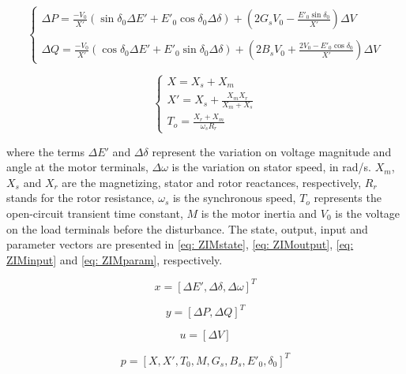 \begin{apendicesenv}
\begin{equation}
    \begin{cases}
        \Delta P = \frac{-V_{0}}{X'}(\sin{\delta_{0}}\Delta E' + E'_{0}\cos{\delta_{0}}\Delta \delta) + \left(2G_{s} V_{0} - \frac{E'_{0} \sin{\delta_{0}}}{X'}\right)\Delta V \\
        \\
        \Delta Q = \frac{-V_{0}}{X'}(\cos{\delta_{0}}\Delta E' + E'_{0}\sin{\delta_{0}}\Delta\delta) + \left(2B_{s} V_{0} + \frac{2V_{0} - E'_{0} \cos{\delta_{0}}}{X'}\right)\Delta V
    \end{cases}
    \label{eq: yZIM}
\end{equation}

\begin{equation}
    \begin{cases}
    X = X_{s} + X_{m} \\
    X' = X_{s} + \frac{X_{m} X_{r}}{X_{m} + X_{s}} \\
    T_{o} = \frac{X_{r} + X_{m}}{\omega_{s} R_{r}}
    \end{cases}
    \label{eq: terms}
\end{equation}

\noindent where the terms $\Delta E'$ and $\Delta \delta$ represent the variation on voltage magnitude and angle at the motor terminals, $\Delta \omega$ is the variation on stator speed, in rad/s. $X_m$, $X_s$ and $X_r$ are the magnetizing, stator and rotor reactances, respectively, $R_r$ stands for the rotor resistance, $\omega_{s}$ is the synchronous speed, $T_o$ represents the open-circuit transient time constant, $M$ is the motor inertia and $V_{0}$ is the voltage on the load terminals before the disturbance. The state, output, input and parameter vectors are presented in \eqref{eq: ZIMstate}, \eqref{eq: ZIMoutput}, \eqref{eq: ZIMinput} and \eqref{eq: ZIMparam}, respectively.

\begin{equation}
	x = [\Delta E', \Delta \delta, \Delta \omega]^{T}
	\label{eq: ZIMstate}
\end{equation}

\begin{equation}
	y = [\Delta P, \Delta Q]^{T}
	\label{eq: ZIMoutput}
\end{equation}

\begin{equation}
	u = [\Delta V]
	\label{eq: ZIMinput}
\end{equation}

\begin{equation}
	p = [X, X', T_{0}, M, G_{s}, B_{s}, E'_{0}, \delta_{0}]^{T}
	\label{eq: ZIMparam}
\end{equation}


\end{apendicesenv}
